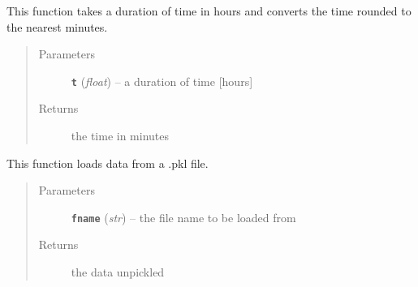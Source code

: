 \documentclass[letterpaper,10pt,english]{sphinxmanual}
\begin{document}

\begin{fulllineitems}
\label{my_globals:my_globals.hours_to_minutes}
This function takes a duration of time in hours and converts the time rounded to the nearest minutes.
\begin{quote}\begin{description}
\item[{Parameters}] \leavevmode
\textbf{\texttt{t}} (\emph{float}) -- a duration of time {[}hours{]}

\item[{Returns}] \leavevmode
the time in minutes

\end{description}\end{quote}

\end{fulllineitems}


\begin{fulllineitems}
\label{my_globals:my_globals.load}
This function loads data from a .pkl file.
\begin{quote}\begin{description}
\item[{Parameters}] \leavevmode
\textbf{\texttt{fname}} (\emph{str}) -- the file name to be loaded from

\item[{Returns}] \leavevmode
the data unpickled

\end{description}\end{quote}

\end{fulllineitems}

\end{document}
